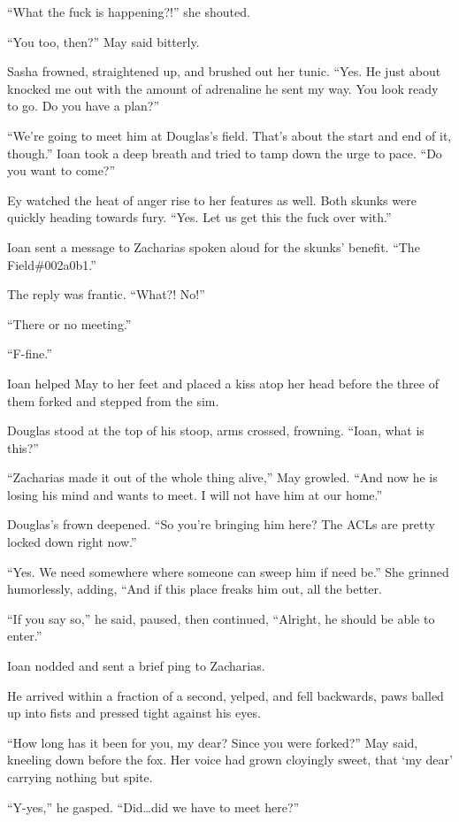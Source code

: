 ``What the fuck is happening?!'' she shouted.

``You too, then?'' May said bitterly.

Sasha frowned, straightened up, and brushed out her tunic. ``Yes. He just about knocked me out with the amount of adrenaline he sent my way. You look ready to go. Do you have a plan?''

``We're going to meet him at Douglas's field. That's about the start and end of it, though.'' Ioan took a deep breath and tried to tamp down the urge to pace. ``Do you want to come?''

Ey watched the heat of anger rise to her features as well. Both skunks were quickly heading towards fury. ``Yes. Let us get this the fuck over with.''

Ioan sent a message to Zacharias spoken aloud for the skunks' benefit. ``The Field\#002a0b1.''

The reply was frantic. ``What?! No!''

``There or no meeting.''

``F-fine.''

Ioan helped May to her feet and placed a kiss atop her head before the three of them forked and stepped from the sim.

Douglas stood at the top of his stoop, arms crossed, frowning. ``Ioan, what is this?''

``Zacharias made it out of the whole thing alive,'' May growled. ``And now he is losing his mind and wants to meet. I will not have him at our home.''

Douglas's frown deepened. ``So you're bringing him here? The ACLs are pretty locked down right now.''

``Yes. We need somewhere where someone can sweep him if need be.'' She grinned humorlessly, adding, ``And if this place freaks him out, all the better.

``If you say so,'' he said, paused, then continued, ``Alright, he should be able to enter.''

Ioan nodded and sent a brief ping to Zacharias.

He arrived within a fraction of a second, yelped, and fell backwards, paws balled up into fists and pressed tight against his eyes.

``How long has it been for you, my dear? Since you were forked?'' May said, kneeling down before the fox. Her voice had grown cloyingly sweet, that `my dear' carrying nothing but spite.

``Y-yes,'' he gasped. ``Did\ldots did we have to meet here?''

